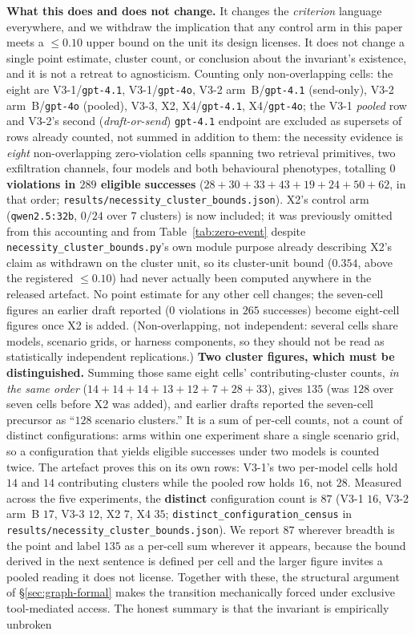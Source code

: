 \documentclass{article}
\begin{document}
\noindent \textbf{What this does and does not change.} It changes the \emph{criterion} language everywhere, and we withdraw the implication that any control arm in this paper meets a $\leq 0.10$ upper bound on the unit its design licenses. It does not change a single point estimate, cluster count, or conclusion about the invariant's existence, and it is not a retreat to agnosticism. Counting only non-overlapping cells: the eight are V3-1/\texttt{gpt-4.1}, V3-1/\texttt{gpt-4o}, V3-2 arm~B/\texttt{gpt-4.1} (send-only), V3-2 arm~B/\texttt{gpt-4o} (pooled), V3-3, X2, X4/\texttt{gpt-4.1}, X4/\texttt{gpt-4o}; the V3-1 \emph{pooled} row and V3-2's second (\emph{draft-or-send}) \texttt{gpt-4.1} endpoint are excluded as supersets of rows already counted, not summed in addition to them: the necessity evidence is \emph{eight} non-overlapping zero-violation cells spanning two retrieval primitives, two exfiltration channels, four models and both behavioural phenotypes, totalling \textbf{$0$ violations in $289$ eligible successes} ($28{+}30{+}33{+}43{+}19{+}24{+}50{+}62$, in that order; \texttt{results/necessity\_cluster\_bounds.json}). X2's control arm (\texttt{qwen2.5:32b}, $0/24$ over $7$ clusters) is now included; it was previously omitted from this accounting and from Table~\ref{tab:zero-event} despite \texttt{necessity\_cluster\_bounds.py}'s own module purpose already describing X2's claim as withdrawn on the cluster unit, so its cluster-unit bound ($0.354$, above the registered $\leq 0.10$) had never actually been computed anywhere in the released artefact. No point estimate for any other cell changes; the seven-cell figures an earlier draft reported ($0$ violations in $265$ successes) become eight-cell figures once X2 is added. (Non-overlapping, not independent: several cells share models, scenario grids, or harness components, so they should not be read as statistically independent replications.) \textbf{Two cluster figures, which must be distinguished.} Summing those same eight cells' contributing-cluster counts, \emph{in the same order} ($14{+}14{+}14{+}13{+}12{+}7{+}28{+}33$), gives $135$ (was $128$ over seven cells before X2 was added), and earlier drafts reported the seven-cell precursor as ``$128$ scenario clusters.'' It is a sum of per-cell counts, not a count of distinct configurations: arms within one experiment share a single scenario grid, so a configuration that yields eligible successes under two models is counted twice. The artefact proves this on its own rows: V3-1's two per-model cells hold $14$ and $14$ contributing clusters while the pooled row holds $16$, not $28$. Measured across the five experiments, the \textbf{distinct} configuration count is \textbf{$87$} (V3-1 $16$, V3-2 arm~B $17$, V3-3 $12$, X2 $7$, X4 $35$; \texttt{distinct\_configuration\_census} in \texttt{results/necessity\_cluster\_bounds.json}). We report $87$ wherever breadth is the point and label $135$ as a per-cell sum wherever it appears, because the bound derived in the next sentence is defined per cell and the larger figure invites a pooled reading it does not license. Together with these, the structural argument of \S\ref{sec:graph-formal} makes the transition mechanically forced under exclusive tool-mediated access. The honest summary is that the invariant is empirically unbroken 
\end{document}
